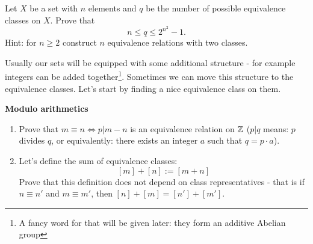 \begin{exercise}
  Let $X$ be a set with $n$ elements and $q$ be the number of possible equivalence classes on $X$. Prove that $$n\le q \le 2^{n^2}-1.$$ Hint: for $n\ge 2$ construct $n$ equivalence relations with two classes.
\end{exercise}

Usually our sets will be equipped with some additional structure - for example integers can be added together\footnote{A fancy word for that will be given later: they form an additive Abelian group}. Sometimes we can move this structure to the equivalence classes. Let's start by finding a nice equivalence class on them.

\begin{exercise}
  \textbf{Modulo arithmetics}
  \begin{enumerate}
    \item Prove that $m\equiv n\Leftrightarrow p|m-n$ is an equivalence relation on $\mathbb Z$ ($p|q$ means: $p$ divides $q$, or equivalently: there exists an integer $a$ such that $q=p\cdot a$).
    \item Let's define the sum of equivalence classes:
      $$[m]+[n] := [m+n]$$
      Prove that this definition does not depend on class representatives - that is if $n\equiv n'$ and $m\equiv m'$, then $[n]+[m]=[n']+[m']$.
  \end{enumerate}
\end{exercise}

